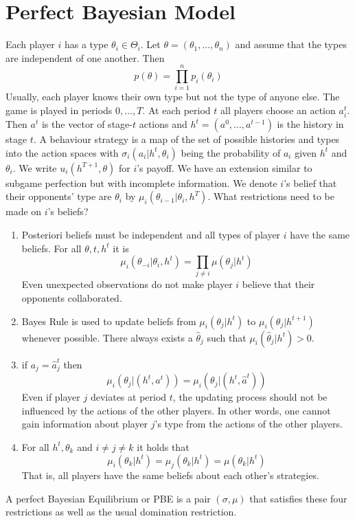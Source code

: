 \documentclass[a4paper, 12pt]{article}
\theoremstyle{plain}
\theoremstyle{definition}
\theoremstyle{lemma}
\theoremstyle{remark}
\theoremstyle{corollary}
\theoremstyle{example}
\begin{document}
	\section{Perfect Bayesian Model}
	Each player $i$ has a type $\theta_i \in \Theta_i$. Let $\theta= (\theta_1,...,\theta_n)$ and assume that the types are independent of one another. Then \[p(\theta) = \prod_{i=1}^n p_i(\theta_i)\] Usually, each player knows their own type but not the type of anyone else. The game is played in periods $0,...,T$. At each period $t$ all players choose an action $a_i^t$. Then $a^t$ is the vector of stage-$t$ actions and $h^t = (a^0,...,a^{t-1})$ is the history in stage $t$. A behaviour strategy is a map of the set of possible histories and types into the action spaces with $\sigma_i(a_i|h^t,\theta_i)$ being the probability of $a_i$ given $h^t$ and $\theta_i$. We write $u_i(h^{T+1},\theta)$ for $i$'s payoff. We have an extension similar to subgame perfection but with incomplete information. We denote $i$'s belief that their opponents' type are $\theta_i$ by $\mu_i(\theta_{i-1}|\theta_i,h^T)$. What restrictions need to be made on $i$'s beliefs?
	\begin{enumerate}
		\item Posteriori beliefs must be independent and all types of player $i$ have the same beliefs. For all $\theta,t,h^t$ it is \[\mu_i(\theta_{-i}|\theta_i,h^t) = \prod_{j\neq i} \mu(\theta_j|h^t)\]
		Even unexpected observations do not make player $i$ believe that their opponents collaborated.
		\item Bayes Rule is used to update beliefs from $\mu_i(\theta_j|h^t)$ to $\mu_i(\theta_j|h^{t+1})$ whenever possible. There always exists a $\hat\theta_j$ such that $\mu_i(\hat\theta_j|h^t) > 0$.
		\item if $a_j = \hat a_j^t$ then \[\mu_i(\theta_j|(h^t,a^t)) = \mu_i(\theta_j|(h^t,\hat a^t))\] Even if player $j$ deviates at period $t$, the updating process should not be influenced by the actions of the other players. In other words, one cannot gain information about player $j$'s type from the actions of the other players.
		\item For all $h^t,\theta_k$ and $i\neq j \neq k$ it holds that \[\mu_i(\theta_k|h^t) = \mu_j(\theta_k|h^t) = \mu(\theta_k | h^t)\]
		That is, all players have the same beliefs about each other's strategies.
	\end{enumerate}
	A perfect Bayesian Equilibrium or PBE is a pair $(\sigma,\mu)$ that satisfies these four restrictions as well as the usual domination restriction.
\end{document}
